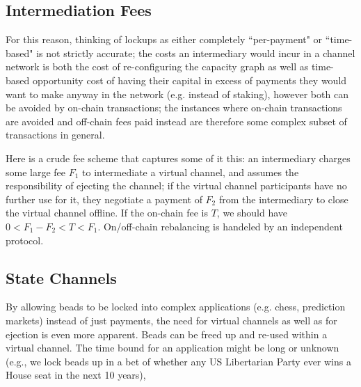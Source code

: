 \documentclass{article}
\begin{document}
\begin{figure}[H]
    \centering
\end{figure}

\subsection*{Intermediation Fees}

For this reason, thinking of lockups as either completely ``per-payment" or ``time-based" is not strictly accurate; the costs an intermediary would incur in a channel network is both the cost of re-configuring the capacity graph as well as time-based opportunity cost of having their capital in excess of payments they would want to make anyway in the network (e.g. instead of staking), however both can be avoided by on-chain transactions; the instances where on-chain transactions are avoided and off-chain fees paid instead are therefore some complex subset of transactions in general.

Here is a crude fee scheme that captures some of it this: an intermediary charges some large fee $F_1$ to intermediate a virtual channel, and assumes the responsibility of ejecting the channel; if the virtual channel participants have no further use for it, they negotiate a payment of $F_2$ from the intermediary to close the virtual channel offline. If the on-chain fee is $T$, we should have $0 < F_1 - F_2 < T < F_1$. On/off-chain rebalancing is handeled by an independent protocol.

\subsection*{State Channels}

By allowing beads to be locked into complex applications (e.g. chess, prediction markets) instead of just payments, the need for virtual channels as well as for ejection is even more apparent. Beads can be freed up and re-used within a virtual channel. The time bound for an application might be long or unknown (e.g., we lock beads up in a bet of whether any US Libertarian Party ever wins a House seat in the next 10 years),
\end{document}
